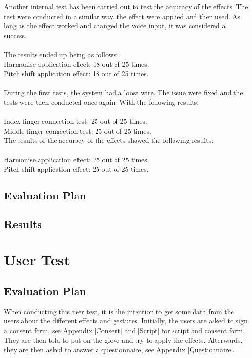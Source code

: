 Another internal test has been carried out to test the accuracy of the effects. The test were conducted in a similar way, the effect were applied and then used. 
As long as the effect worked and changed the voice input, it was considered a success. \\\\

The results ended up being as follows:\\
Harmonise application effect: 18 out of 25 times. \\
Pitch shift application effect: 18 out of 25 times. \\\\

During the first tests, the system had a loose wire. The issue were fixed and the tests were then conducted once again. With the following results:\\\\

Index finger connection test: 25 out of 25 times. \\
Middle finger connection test: 25 out of 25 times. \\

The results of the accuracy of the effects showed the following results:\\\\

Harmonise application effect: 25 out of 25 times. \\
Pitch shift application effect: 25 out of 25 times. 

\subsection{Evaluation Plan}

\subsection{Results}


\section{User Test}

\subsection{Evaluation Plan}

When conducting this user test, it is the intention to get some data from the users about the different effects and gestures. 
Initially, the users are asked to sign a consent form, see Appendix \ref{Consent} and \ref{Script} for script and consent form. They are then told to put on the glove and try to apply the effects. Afterwards, they are then asked to answer a questionnaire, see Appendix \ref{Questionnaire}. 

